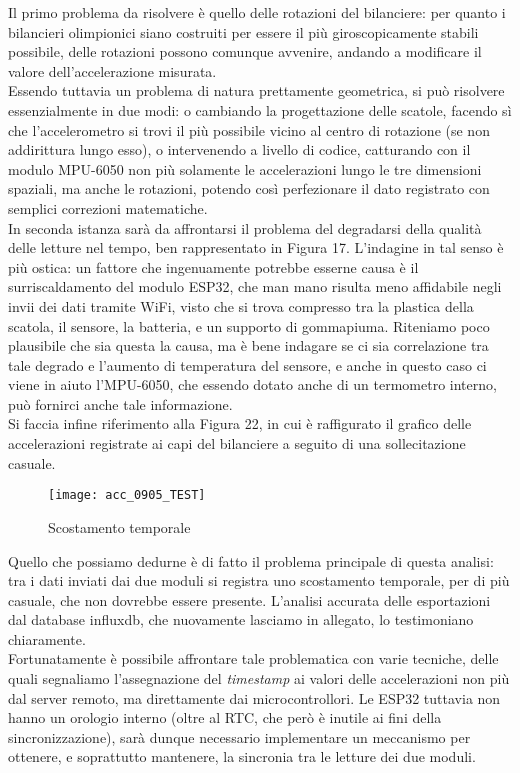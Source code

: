 \documentclass[fleqn,10pt]{SelfArx} %
\begin{document}
Il primo problema da risolvere è quello delle rotazioni del bilanciere: per quanto i bilancieri olimpionici siano costruiti per 
essere il più giroscopicamente stabili possibile, delle rotazioni possono comunque avvenire, andando a modificare il valore 
dell'accelerazione misurata.\\
Essendo tuttavia un problema di natura prettamente geometrica, si può risolvere essenzialmente in due modi: o cambiando la 
progettazione delle scatole, facendo sì che l'accelerometro si trovi il più possibile vicino al centro 
di rotazione (se non addirittura lungo esso), o intervenendo a livello di codice, catturando con il modulo MPU-6050 non più 
solamente le accelerazioni lungo le tre dimensioni spaziali, ma anche le rotazioni, potendo così perfezionare il dato registrato 
con semplici correzioni matematiche.\\

In seconda istanza sarà da affrontarsi il problema del degradarsi della qualità delle letture nel tempo, ben rappresentato in Figura 17. 
L'indagine in tal senso è più ostica: un fattore che ingenuamente potrebbe esserne causa è il surriscaldamento del modulo ESP32, 
che man mano risulta meno affidabile negli invii dei dati tramite WiFi, visto che si trova compresso tra la plastica della scatola, il sensore, 
la batteria, e un supporto di gommapiuma. Riteniamo poco plausibile che sia questa la causa, ma è bene indagare se ci sia correlazione tra tale 
degrado e l'aumento di temperatura del sensore, e anche in questo caso ci viene in aiuto l'MPU-6050, che essendo dotato anche di un 
termometro interno, può fornirci anche tale informazione.\\

Si faccia infine riferimento alla Figura 22, in cui è raffigurato il grafico delle accelerazioni registrate ai 
capi del bilanciere a seguito di una sollecitazione casuale.	
\begin{figure}[htb]
	\texttt{[image: acc\_0905\_TEST]}
	\caption{Scostamento temporale}
	\label{fig:scostamento temporale}
\end{figure}

Quello che possiamo dedurne è di fatto il problema principale di questa analisi: 
tra i dati inviati dai due moduli si registra uno scostamento temporale, per di più casuale, che non dovrebbe essere presente. 
L'analisi accurata delle esportazioni dal database influxdb, che nuovamente lasciamo in allegato, lo testimoniano chiaramente.\\
Fortunatamente è possibile affrontare tale problematica con varie tecniche, delle quali segnaliamo l'assegnazione del 
\textit{timestamp} ai valori delle accelerazioni non più dal server remoto, ma direttamente dai microcontrollori. 
Le ESP32 tuttavia non hanno un orologio interno (oltre al RTC, che però è inutile ai fini della sincronizzazione), sarà dunque 
necessario implementare un meccanismo per ottenere, e soprattutto mantenere, la sincronia tra le letture dei due moduli.
\end{document}
